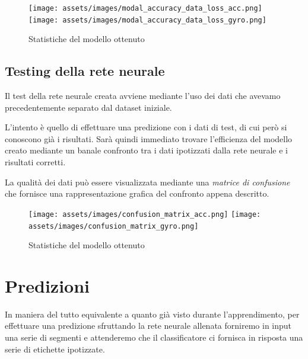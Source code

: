 \begin{figure}[H]
    \centering
    \texttt{[image: assets/images/modal\_accuracy\_data\_loss\_acc.png]}
    \centering
    \texttt{[image: assets/images/modal\_accuracy\_data\_loss\_gyro.png]}
    \caption{Statistiche del modello ottenuto}
\end{figure}

\subsection{Testing della rete neurale}
Il test della rete neurale creata avviene mediante l'uso dei dati che avevamo precedentemente separato dal dataset iniziale.

L'intento è quello di effettuare una predizione con i dati di test, di cui però si conoscono già i risultati. 
Sarà quindi immediato trovare l'efficienza del modello creato mediante un banale confronto tra i dati ipotizzati 
dalla rete neurale e i risultati corretti.

La qualità dei dati può essere visualizzata mediante una \textit{matrice di confusione} che fornisce una rappresentazione grafica del confronto appena descritto.

\begin{figure}[H]
    \centering
    \texttt{[image: assets/images/confusion\_matrix\_acc.png]}
    \centering
    \texttt{[image: assets/images/confusion\_matrix\_gyro.png]}
    \caption{Statistiche del modello ottenuto}
\end{figure}

\section{Predizioni}
In maniera del tutto equivalente a quanto già visto durante l'apprendimento, per effettuare una predizione sfruttando
la rete neurale allenata forniremo in input una serie di segmenti e attenderemo che il classificatore ci fornisca in risposta
una serie di etichette ipotizzate.

